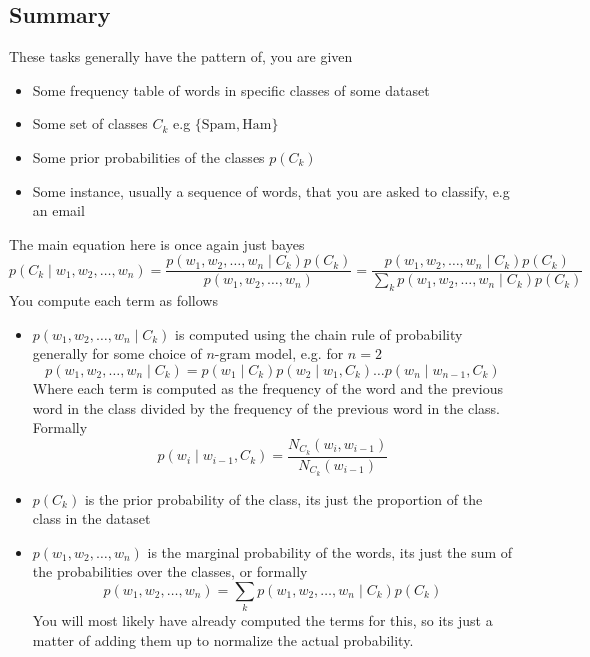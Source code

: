 \documentclass[12pt]{article}
\begin{document}
\subsection{Summary}
These tasks generally have the pattern of, you are given 
\begin{itemize}[leftmargin=*, noitemsep]
    \item Some frequency table of words in specific classes of some dataset
    \item Some set of classes $C_k$ e.g $\{\text{Spam}, \text{Ham}\}$
    \item Some prior probabilities of the classes $p(C_k)$
    \item Some instance, usually a sequence of words, that you are asked to classify, e.g an email
\end{itemize}
The main equation here is once again just bayes 
\[
    p(C_k\mid w_1, w_2, \ldots, w_n) = \frac{p(w_1, w_2, \ldots, w_n\mid C_k)p(C_k)}{p(w_1, w_2, \ldots, w_n)} = \frac{p(w_1, w_2, \ldots, w_n\mid C_k)p(C_k)}{\sum_k p(w_1, w_2, \ldots, w_n\mid C_k)p(C_k)}  
\]
You compute each term as follows 
\begin{itemize}
    \item $p(w_1, w_2, \ldots, w_n\mid C_k)$ is computed using the chain rule of probability generally for some choice of $n$-gram model, e.g. for $n = 2$
    \[
        p(w_1, w_2, \ldots, w_n\mid C_k) = p(w_1\mid C_k)p(w_2\mid w_1, C_k)\dots p(w_n\mid w_{n-1}, C_k)
    \]
    Where each term is computed as the frequency of the word and the previous word in the class divided by the frequency of the previous word in the class. Formally 
    \[
        p(w_i\mid w_{i-1}, C_k) = \frac{N_{C_k}(w_i, w_{i-1})}{N_{C_k}(w_{i-1})}    
    \]
    \item $p(C_k)$ is the prior probability of the class, its just the proportion of the class in the dataset
    \item $p(w_1, w_2, \ldots, w_n)$ is the marginal probability of the words, its just the sum of the probabilities over the classes, or formally 
    \[
        p(w_1, w_2, \ldots, w_n) = \sum_k p(w_1, w_2, \ldots, w_n\mid C_k)p(C_k)
    \]
    You will most likely have already computed the terms for this, so its just a matter of adding them up to normalize the actual probability.
\end{itemize}
\end{document}
